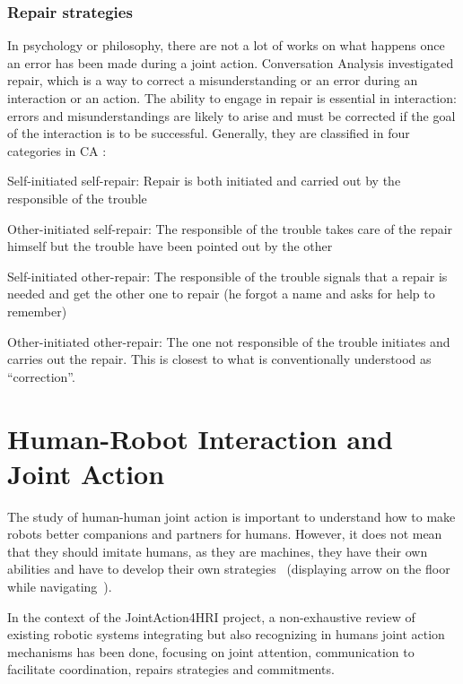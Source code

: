 \documentclass[a4paper,11pt,twoside]{StyleThese}
\begin{document}
\subsubsection{Repair strategies}
In psychology or philosophy, there are not a lot of works on what happens once an error has been made during a joint action. Conversation Analysis investigated repair, which is a way to correct a misunderstanding or an error during an interaction or an action. The ability to engage in repair is essential in interaction: errors and misunderstandings are likely to arise and must be corrected if the  goal of the interaction is to be successful. Generally, they are classified in four categories in CA \cite{schegloff_1977_preference,wooffitt_2008_conversation}:
\begin{bulletList}
	\item Self-initiated self-repair: Repair is both initiated and carried out by the responsible of the trouble
	\item Other-initiated self-repair: The responsible of the trouble takes care of the repair himself but the trouble have been pointed out by the other
	\item Self-initiated other-repair: The responsible of the trouble signals that a repair is needed and get the other one to repair (\eg he forgot a name and asks for help to remember)
	\item Other-initiated other-repair: The one not responsible of the trouble initiates and carries out the repair. This is closest to what is conventionally understood as ``correction''.
\end{bulletList}

\section{Human-Robot Interaction and Joint Action}\label{chap1:sec:hri_ja}
The study of human-human joint action is important to understand how to make robots better companions and partners for humans. However, it does not mean that they should imitate humans, as they are machines, they have their own abilities and have to develop their own strategies~\cite{bradshaw_2017_human} (\eg displaying arrow on the floor while navigating~\cite{chadalavada_2015_mind, coovert_2014_spatial}).

In the context of the JointAction4HRI project, a non-exhaustive review of existing robotic systems integrating but also recognizing in humans joint action mechanisms has been done, focusing on joint attention, communication to facilitate coordination, repairs strategies and commitments.
\end{document}
